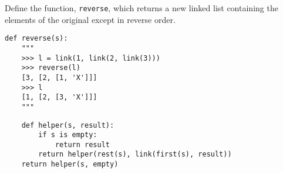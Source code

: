 \begin{blocksection}
\question Define the function, \lstinline$reverse$, which returns a new linked list containing the elements of the original except in reverse order.

\begin{lstlisting}
def reverse(s):
    """
    >>> l = link(1, link(2, link(3)))
    >>> reverse(l)
    [3, [2, [1, 'X']]]
    >>> l
    [1, [2, [3, 'X']]]
    """
\end{lstlisting}

\begin{solution}[1.5in]
\begin{lstlisting}
    def helper(s, result):
        if s is empty:
            return result
        return helper(rest(s), link(first(s), result))
    return helper(s, empty)
\end{lstlisting}
\end{solution}
\end{blocksection}
